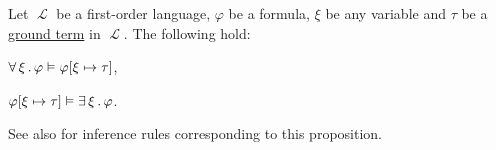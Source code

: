 \begin{proposition}\label{thm:quantifier_satisfiability}
  Let \( \mscrL \) be a first-order language, \( \varphi \) be a formula, \( \xi \) be any variable and \( \tau \) be a \hyperref[def:first_order_syntax/ground_term]{ground term} in \( \mscrL \). The following hold:

  \begin{thmenum}
     \( \forall \thinspace \xi \thinspace . \thinspace \varphi \vDash \varphi[\xi \mapsto \tau] \),

     \( \varphi[\xi \mapsto \tau] \vDash \exists \thinspace \xi \thinspace . \thinspace \varphi \).
  \end{thmenum}

  See also  for inference rules corresponding to this proposition.
\end{proposition}
